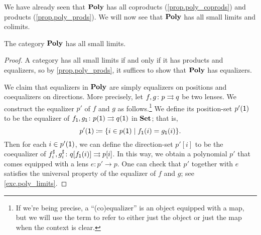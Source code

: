 \documentclass[Book-Poly]{subfiles}
\begin{document}
We have already seen that $\mathbf{Poly}$ has all coproducts (\cref{prop.poly_coprods}) and products (\cref{prop.poly_prods}).
We will now see that $\mathbf{Poly}$ has all small limits and colimits.

\begin{theorem}\label{thm.poly_limits}
The category $\mathbf{Poly}$ has all small limits.
\end{theorem}
\begin{proof}
A category has all small limits if and only if it has products and equalizers, so by \cref{prop.poly_prods}, it suffices to show that $\mathbf{Poly}$ has equalizers. 

We claim that equalizers in $\mathbf{Poly}$ are simply equalizers on positions and coequalizers on directions.
More precisely, let $f,g \colon p \rightrightarrows q$ be two lenses.
We construct the equalizer $p'$ of $f$ and $g$ as follows.\footnote{If we're being precise, a ``(co)equalizer'' is an object equipped with a map, but we will use the term to refer to either just the object or just the map when the context is clear.}
We define its position-set $p'(\textsf{1})$ to be the equalizer of $f_{\textsf{1}},g_{\textsf{1}} \colon p(\textsf{1}) \rightrightarrows q(\textsf{1})$ in $\mathbf{Set}$; that is,
\[
    p'(\textsf{1}) \coloneqq \{i \in p(\textsf{1}) \mid f_{\textsf{1}}(i) = g_{\textsf{1}}(i)\}.
\]
Then for each $i \in p'(\textsf{1})$, we can define the direction-set $p'[i]$ to be the coequalizer of $f^\sharp_i, g^\sharp_i \colon q[f_{\textsf{1}}(i)] \rightrightarrows p[i]$.
In this way, we obtain a polynomial $p'$ that comes equipped with a lens $e \colon p' \to p$.
One can check that $p'$ together with $e$ satisfies the universal property of the equalizer of $f$ and $g$; see \cref{exc.poly_limits}.
\end{proof}
\end{document}
